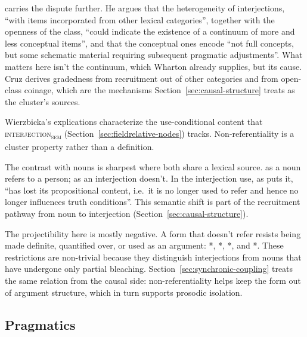 \documentclass[12pt]{article}
\newcommand{\intj}[1]{\textsc{interjection\textsubscript{#1}}}
\begin{document}
\textcite[241]{cruz2009} carries the dispute further. He argues that the
heterogeneity of interjections, \enquote{with items incorporated from other
lexical categories}, together with the openness of the class, \enquote{could
indicate the existence of a continuum of more and less conceptual items}, and
that the conceptual ones encode \enquote{not full concepts, but some schematic
material requiring subsequent pragmatic adjustments}. What matters here isn't
the continuum, which Wharton already supplies, but its cause. Cruz derives
gradedness from recruitment out of other categories and from open-class
coinage, which are the mechanisms Section~\ref{sec:causal-structure} treats as
the cluster's sources.

Wierzbicka's explications characterize the use-conditional content that
\intj{sem} (Section~\ref{sec:fieldrelative-nodes})
tracks. Non-referentiality is a cluster property rather than a
definition.

The contrast with nouns is sharpest where both share a lexical source.
 as a noun refers to a person;  as an
interjection doesn't. In the interjection use, as
\textcite[88]{gehweiler2008} puts it,  \enquote{has lost
its propositional content, i.e.\ it is no longer used to refer and hence
no longer influences truth conditions}.
This semantic shift is part of the recruitment pathway from noun to
interjection (Section~\ref{sec:causal-structure}).

The projectibility here is mostly negative. A form that doesn't refer
resists being made definite, quantified over, or used as an argument:
*, *, *,
and *. These restrictions are non-trivial because
they distinguish interjections from nouns that have undergone only partial
bleaching. Section~\ref{sec:synchronic-coupling} treats the same relation from
the causal side: non-referentiality helps keep the form out of
argument structure, which in turn supports prosodic isolation.

\subsection{Pragmatics}\label{sec:pragmatics}
\end{document}
